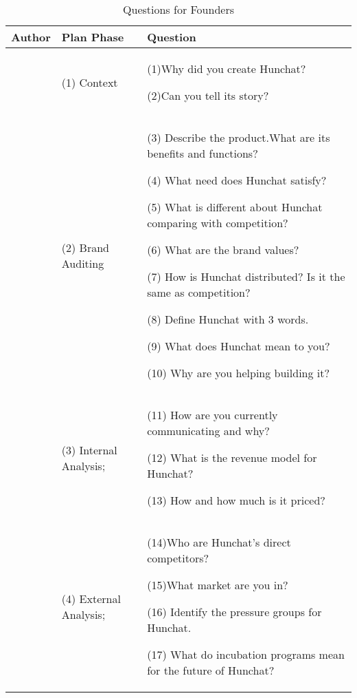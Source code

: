 \documentclass[12pt]{article}
\begin{document}
\begin{table}[htbp]
\small
\caption{Questions for Founders}
\label{table:founder}
\centering
\begin{tabular}{ @{}P{0.15\textwidth}P{0.2\textwidth}P{0.6\textwidth}@{} }
Author                      & Plan Phase             & Question                                                                                                                                                                                                                                                                                                                                                                                                                         \\ \hline
  &  (1) Context & (1)Why did you create Hunchat? \par (2)Can you tell its story? \\ 
\cite{kliatchko}             & (2) Brand Auditing     & (3) Describe the product.What are its benefits and functions? \par (4) What need does Hunchat satisfy? \par (5) What is different about Hunchat comparing with competition? \par (6) What are the brand values?   \par (7) How is Hunchat distributed? Is it the same as competition?   \par (8) Define Hunchat with 3 words.   \par (9) What does Hunchat mean to you?    \par (10) Why are you helping building it? 
\\
 \hline
 		       & (3) Internal Analysis; &  (11) How are you currently communicating and why?   \par  (12) What is the revenue model for Hunchat?   \par  (13) How and how much is it priced?                                                                                                                                                                                                                                                \\
 \cite{clow}                           & (4) External Analysis; & (14)Who are Hunchat’s direct competitors?   \par  (15)What market are you in?   \par  (16) Identify the pressure groups for Hunchat.   \par (17) What do incubation programs mean for the future of Hunchat?                                                                                                                                                                                             \\

\end{tabular}
\end{table}
\end{document}
